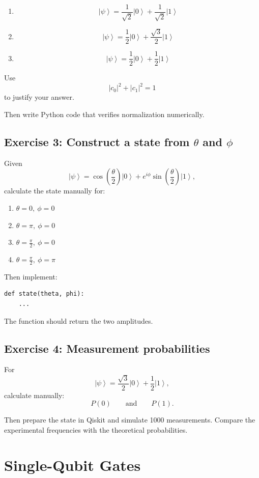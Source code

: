 \documentclass[12pt,a4paper]{article}
\newcommand{\ket}[1]{\left|#1\right\rangle}
\begin{document}
\begin{enumerate}[label=(\alph*)]
    \item
    \[
    \ket{\psi}=
    \frac{1}{\sqrt{2}}\ket{0}+
    \frac{1}{\sqrt{2}}\ket{1}
    \]
    \item
    \[
    \ket{\psi}=
    \frac{1}{2}\ket{0}+
    \frac{\sqrt{3}}{2}\ket{1}
    \]
    \item
    \[
    \ket{\psi}=
    \frac{1}{2}\ket{0}+
    \frac{1}{2}\ket{1}
    \]
\end{enumerate}

Use
\[
|c_0|^2+|c_1|^2=1
\]
to justify your answer.

Then write Python code that verifies normalization numerically.

\subsection*{Exercise 3: Construct a state from $\theta$ and $\phi$}
Given
\[
\ket{\psi}=
\cos\left(\frac{\theta}{2}\right)\ket{0}
+
e^{i\phi}\sin\left(\frac{\theta}{2}\right)\ket{1},
\]
calculate the state manually for:
\begin{enumerate}
    \item $\theta=0,\ \phi=0$
    \item $\theta=\pi,\ \phi=0$
    \item $\theta=\frac{\pi}{2},\ \phi=0$
    \item $\theta=\frac{\pi}{2},\ \phi=\pi$
\end{enumerate}

Then implement:
\begin{lstlisting}
def state(theta, phi):
    ...
\end{lstlisting}

The function should return the two amplitudes.

\subsection*{Exercise 4: Measurement probabilities}
For
\[
\ket{\psi}=
\frac{\sqrt{3}}{2}\ket{0}
+
\frac{1}{2}\ket{1},
\]
calculate manually:
\[
P(0)
\qquad\text{and}\qquad
P(1).
\]

Then prepare the state in Qiskit and simulate 1000 measurements. Compare the experimental frequencies with the theoretical probabilities.

\section{Single-Qubit Gates}
\end{document}
